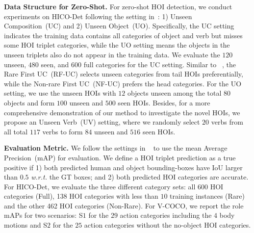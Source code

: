 \documentclass[10pt,twocolumn,letterpaper]{article}
\begin{document}
\vspace{1mm}\noindent\textbf{Data Structure for Zero-Shot.} For zero-shot HOI detection, we conduct experiments on HICO-Det following the setting in~\cite{Bansal2020_aaai_functional}: 1) Unseen Composition~(UC) and 2) Unseen Object~(UO). Specifically, the UC setting indicates the training data contains all categories of object and verb but misses some HOI triplet categories, while the UO setting means the objects in the unseen triplets also do not appear in the training data. We evaluate the $120$ unseen, $480$ seen, and $600$ full categories for the UC setting. Similar to ~\cite{hou2020visual}, the Rare First UC~(RF-UC) selects unseen categories from tail HOIs preferentially, while the Non-rare First UC~(NF-UC) prefers the head categories. For the UO setting, we use the unseen HOIs with $12$ objects unseen among the total $80$ objects and form $100$ unseen and $500$ seen HOIs. Besides, for a more comprehensive demonstration of our method to investigate the novel HOIs, we propose an Unseen Verb~(UV) setting, where we randomly select $20$ verbs from all total $117$ verbs to form $84$ unseen and $516$ seen HOIs. 

\vspace{1mm}\noindent\textbf{Evaluation Metric.} We follow the settings in ~\cite{chao2018learning} to use the mean Average Precision~(mAP) for evaluation. We define a HOI triplet prediction as a true positive if 1) both predicted human and object bounding-boxes have IoU larger than $0.5$ \emph{w.r.t.} the GT boxes; and 2) both predicted HOI categories are accurate. For HICO-Det, we evaluate the three different category sets: all 600 HOI categories (Full), 138 HOI categories with less than $10$ training instances (Rare) and the other 462 HOI categories (Non-Rare). For V-COCO, we report the role mAPs for two scenarios: S$1$ for the $29$ action categories including the $4$ body motions and S$2$ for the $25$ action categories without the no-object HOI categories.
\end{document}
